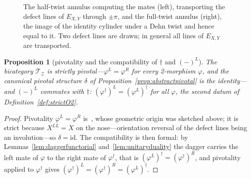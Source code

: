 \documentclass[11pt]{article}
\newtheorem{proposition}[theorem]{Proposition}
\theoremstyle{definition}
\newcommand{\cT}{\mathcal{T}}
\newcommand{\cZ}{\mathcal{Z}}
\newcommand{\dg}{\dagger}
\begin{document}
\begin{figure}[ht]
\centering
{}
\hspace{1.5cm}
\caption{The half-twist annulus computing the mates (left), transporting the defect lines of $E_{X,Y}$ through $\pm\pi$, and the full-twist annulus (right), the image of the identity cylinder under a Dehn twist and hence equal to it. Two defect lines are drawn; in general all lines of $E_{X,Y}$ are transported.}
\label{fig:annuli}
\end{figure}

\begin{proposition}[pivotality and the compatibility of $\dg$ and $(-)^L$]
\label{prop:pivotal}
The bicategory $\cT_\cZ$ is strictly pivotal---$\varphi^L = \varphi^R$ for every 2-morphism $\varphi$, and the canonical pivotal structure $\delta$ of Proposition~\ref{prop:abstractpivotal} is the identity---and $(-)^L$ commutes with $\dg$: $(\varphi^\dg)^L = (\varphi^L)^\dg$ for all $\varphi$, the second datum of Definition~\ref{def:strictO2}.
\end{proposition}

\begin{proof}
Pivotality $\varphi^L = \varphi^R$ is~\cite{DKR11}, whose geometric origin was sketched above; it is strict because $X^{LL} = X$ on the nose---orientation reversal of the defect lines being an involution---so $\delta = \mathrm{id}$. The compatibility is then formal: by Lemmas~\ref{lem:daggerfunctorial} and~\ref{lem:unitaryduality} the dagger carries the left mate of $\varphi$ to the right mate of $\varphi^\dg$, that is $(\varphi^L)^\dg = (\varphi^\dg)^R$, and pivotality applied to $\varphi^\dg$ gives $(\varphi^\dg)^L = (\varphi^\dg)^R = (\varphi^L)^\dg$.
\end{proof}
\end{document}
